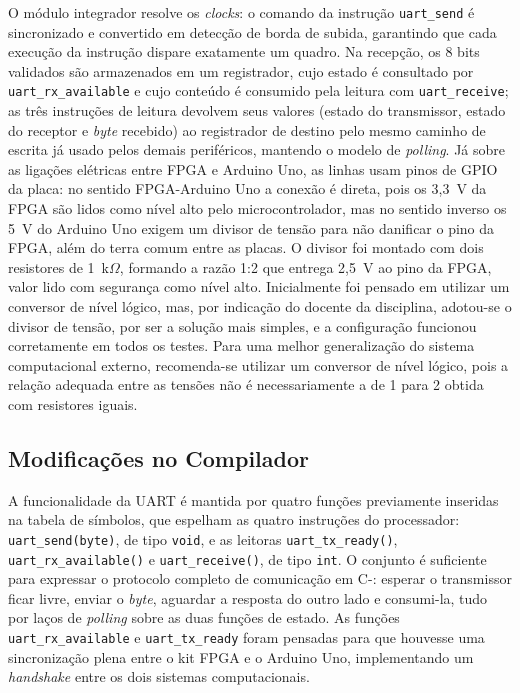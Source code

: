 \documentclass[
	12pt,
	oneside,
	a4paper,
	english,
	french,
	spanish,
	brazil,
	]{abntex2}
\begin{document}
O módulo integrador resolve os \emph{clocks}: o comando da instrução \texttt{uart\_send} é sincronizado e convertido em detecção de borda de subida, garantindo que cada execução da instrução dispare exatamente um quadro. Na recepção, os 8 bits validados são armazenados em um registrador, cujo estado é consultado por \texttt{uart\_rx\_available} e cujo conteúdo é consumido pela leitura com \texttt{uart\_receive}; as três instruções de leitura devolvem seus valores (estado do transmissor, estado do receptor e \emph{byte} recebido) ao registrador de destino pelo mesmo caminho de escrita já usado pelos demais periféricos, mantendo o modelo de \emph{polling}. Já sobre as ligações elétricas entre FPGA e Arduino Uno, as linhas usam pinos de GPIO da placa: no sentido FPGA-Arduino Uno a conexão é direta, pois os 3,3~V da FPGA são lidos como nível alto pelo microcontrolador, mas no sentido inverso os 5~V do Arduino Uno exigem um divisor de tensão para não danificar o pino da FPGA, além do terra comum entre as placas. O divisor foi montado com dois resistores de 1~k$\Omega$, formando a razão 1:2 que entrega 2,5~V ao pino da FPGA, valor lido com segurança como nível alto. Inicialmente foi pensado em utilizar um conversor de nível lógico, mas, por indicação do docente da disciplina, adotou-se o divisor de tensão, por ser a solução mais simples, e a configuração funcionou corretamente em todos os testes. Para uma melhor generalização do sistema computacional externo, recomenda-se utilizar um conversor de nível lógico, pois a relação adequada entre as tensões não é necessariamente a de 1 para 2 obtida com resistores iguais.

\subsection{Modificações no Compilador}

A funcionalidade da UART é mantida por quatro funções previamente inseridas na tabela de símbolos, que espelham as quatro instruções do processador: \texttt{uart\_send(byte)}, de tipo \texttt{void}, e as leitoras \texttt{uart\_tx\_ready()}, \texttt{uart\_rx\_available()} e \texttt{uart\_receive()}, de tipo \texttt{int}. O conjunto é suficiente para expressar o protocolo completo de comunicação em C-: esperar o transmissor ficar livre, enviar o \emph{byte}, aguardar a resposta do outro lado e consumi-la, tudo por laços de \emph{polling} sobre as duas funções de estado. As funções \texttt{uart\_rx\_available} e \texttt{uart\_tx\_ready} foram pensadas para que houvesse uma sincronização plena entre o kit FPGA e o Arduino Uno, implementando um \emph{handshake} entre os dois sistemas computacionais.
\end{document}
